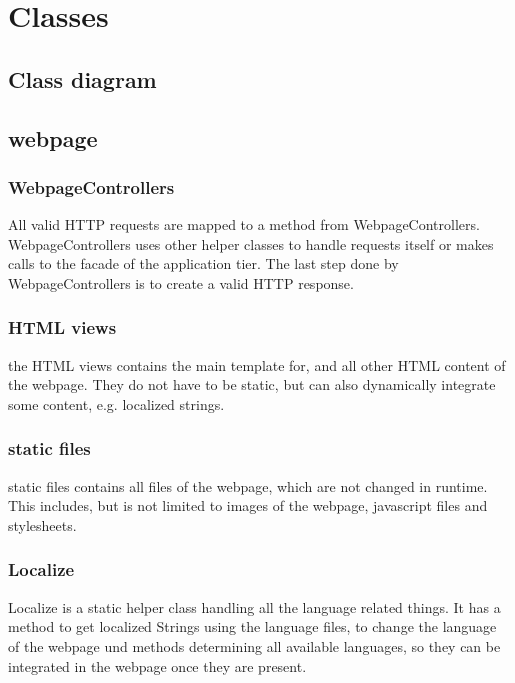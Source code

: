 \section{Classes}

\subsection{Class diagram}

\subsection{webpage} %

\subsubsection*{WebpageControllers}
All valid HTTP requests are mapped to a method from WebpageControllers.
WebpageControllers uses other helper classes to handle requests itself 
or makes calls to the facade of the application tier. 
The last step done by WebpageControllers is to create a valid HTTP response.

\subsubsection*{HTML views}
the HTML views contains the main template for, and all other HTML content of the webpage. 
They do not have to be static, but can also dynamically integrate some content, e.g. localized strings.

\subsubsection*{static files}
static files contains all files of the webpage, which are not changed in runtime. 
This includes, but is not limited to images of the webpage, javascript files and stylesheets.

\subsubsection*{Localize}
Localize is a static helper class handling all the language related things. 
It has a method to get localized Strings using the language files, 
to change the language of the webpage und methods determining all available languages, 
so they can be integrated in the webpage once they are present.

